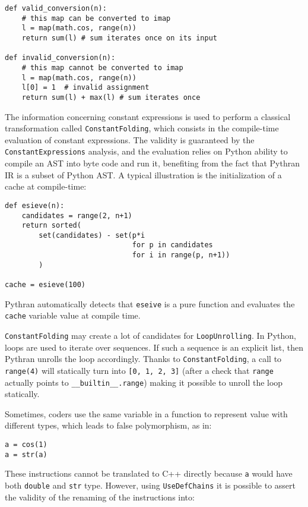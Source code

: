 \documentclass[10pt, onecolumn, preprint]{sigplanconf}
\begin{document}
\begin{lstlisting}
def valid_conversion(n):
    # this map can be converted to imap
    l = map(math.cos, range(n))
    return sum(l) # sum iterates once on its input

def invalid_conversion(n):
    # this map cannot be converted to imap
    l = map(math.cos, range(n))
    l[0] = 1  # invalid assignment
    return sum(l) + max(l) # sum iterates once
\end{lstlisting}

The information concerning constant expressions is used to perform a classical
transformation called \texttt{ConstantFolding}, which consists in the compile-time
evaluation of constant expressions. The validity is guaranteed by the
\texttt{ConstantExpressions} analysis, and the evaluation relies on Python ability to
compile an AST into byte code and run it, benefiting from the fact that Pythran
IR is a subset of Python AST. A typical illustration is the initialization of a
cache at compile-time:

\begin{lstlisting}
def esieve(n):
    candidates = range(2, n+1)
    return sorted(
        set(candidates) - set(p*i
                              for p in candidates
                              for i in range(p, n+1))
        )

cache = esieve(100)
\end{lstlisting}

Pythran automatically detects that \texttt{eseive} is a pure function and evaluates
the \texttt{cache} variable value at compile time.

\texttt{ConstantFolding} may create a lot of candidates for \texttt{LoopUnrolling}. In Python, loops are used to iterate over sequences. If such a sequence is an explicit list, then Pythran unrolls the loop accordingly. Thanks to \texttt{ConstantFolding}, a call to \texttt{range(4)} will statically turn into \texttt{[0, 1, 2, 3]} (after a check that \texttt{range} actually points to \texttt{\_\_builtin\_\_.range}) making it possible to unroll the loop statically.

Sometimes, coders use the same variable in a function to represent value with
different types, which leads to false polymorphism, as in:


\begin{lstlisting}
a = cos(1)
a = str(a)
\end{lstlisting}

These instructions cannot be translated to C++ directly because \texttt{a}
would have both \texttt{double} and \texttt{str} type. However, using
\texttt{UseDefChains} it is possible to assert the validity of the renaming of
the instructions into:
\end{document}
